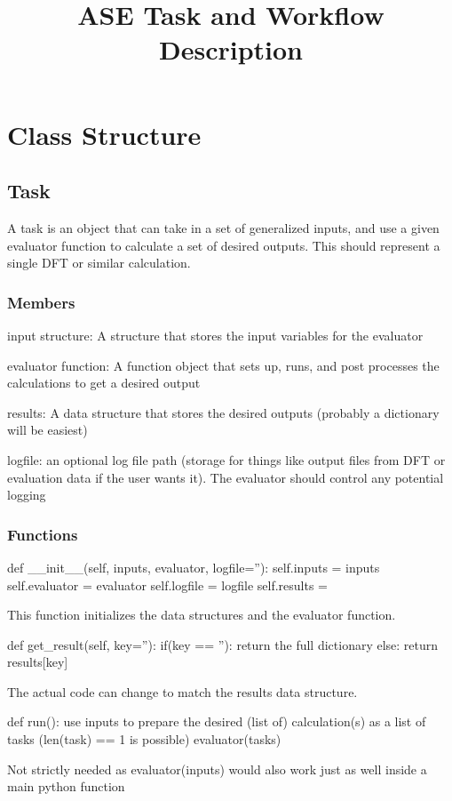 \documentclass [notitlepage, 12pt, a4paper]{article}
\begin{document}
\title{ASE Task and Workflow Description}

\section{Class Structure}

\subsection{Task}
A task is an object that can take in a set of generalized inputs, and use a given evaluator function to calculate a set of desired outputs.
This should represent a single DFT or similar calculation.

\subsubsection{Members}
input structure: A structure that stores the input variables for the evaluator

evaluator function: A function object that sets up, runs, and post processes the calculations to get a desired output

results: A data structure that stores the desired outputs (probably a dictionary will be easiest)

logfile: an optional log file path (storage for things like output files from DFT or evaluation data if the user wants it). The evaluator should control any potential logging

\subsubsection{Functions}
\begin{python}
def __init__(self, inputs, evaluator, logfile=''):
    self.inputs = inputs
    self.evaluator = evaluator
    self.logfile = logfile
    self.results = {}
\end{python}
This function initializes the data structures and the evaluator function.

\begin{python}
def get_result(self, key=''):
    if(key == ''):
        return the full dictionary
    else:
        return results[key]
\end{python}
The actual code can change to match the results data structure.

\begin{python}
def run():
    use inputs to prepare the desired (list of)
    calculation(s) as a list of tasks
    (len(task) == 1 is possible)
    evaluator(tasks)
\end{python}
Not strictly needed as evaluator(inputs) would also work just as well inside a main python function
\end{document}
